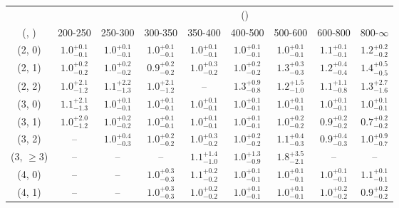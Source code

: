 \begin{table}[h!]
\tiny
\centering
{}
\begin{tabular}
{ccccccccc}
	\hline\hline
&	& \multicolumn{8}{c}{\scalht (\gev)} \\ 
	 (\njet,  \nb) & 200-250 & 250-300 & 300-350 & 350-400 & 400-500 & 500-600 & 600-800 & 800-$\infty$ \\ [0.8ex] 
\hline
	(2, 0) & $1.0^{+ 0.1 }_{- 0.1 }$ & $1.0^{+ 0.1 }_{- 0.1 }$ & $1.0^{+ 0.1 }_{- 0.1 }$ & $1.0^{+ 0.1 }_{- 0.1 }$ & $1.0^{+ 0.1 }_{- 0.1 }$ & $1.0^{+ 0.1 }_{- 0.1 }$ & $1.1^{+ 0.1 }_{- 0.1 }$ & $1.2^{+ 0.2 }_{- 0.2 }$ \\[0.5ex] 
	(2, 1) & $1.0^{+ 0.2 }_{- 0.2 }$ & $1.0^{+ 0.2 }_{- 0.2 }$ & $0.9^{+ 0.2 }_{- 0.2 }$ & $1.0^{+ 0.3 }_{- 0.2 }$ & $1.0^{+ 0.2 }_{- 0.2 }$ & $1.3^{+ 0.3 }_{- 0.3 }$ & $1.2^{+ 0.4 }_{- 0.4 }$ & $1.4^{+ 0.5 }_{- 0.5 }$ \\[0.5ex] 
	(2, 2) & $1.0^{+ 2.1 }_{- 1.2 }$ & $1.1^{+ 2.2 }_{- 1.3 }$ & $1.0^{+ 2.1 }_{- 1.2 }$ & -- & $1.3^{+ 0.9 }_{- 0.8 }$ & $1.2^{+ 1.5 }_{- 1.0 }$ & $1.1^{+ 1.1 }_{- 0.8 }$ & $1.3^{+ 2.7 }_{- 1.6 }$ \\[0.5ex] 
	(3, 0) & $1.1^{+ 2.1 }_{- 1.3 }$ & $1.0^{+ 0.1 }_{- 0.1 }$ & $1.0^{+ 0.1 }_{- 0.1 }$ & $1.0^{+ 0.1 }_{- 0.1 }$ & $1.0^{+ 0.1 }_{- 0.1 }$ & $1.0^{+ 0.1 }_{- 0.1 }$ & $1.0^{+ 0.1 }_{- 0.1 }$ & $1.0^{+ 0.1 }_{- 0.1 }$ \\[0.5ex] 
	(3, 1) & $1.0^{+ 2.0 }_{- 1.2 }$ & $1.0^{+ 0.2 }_{- 0.2 }$ & $1.0^{+ 0.1 }_{- 0.1 }$ & $1.0^{+ 0.1 }_{- 0.1 }$ & $1.0^{+ 0.1 }_{- 0.1 }$ & $1.0^{+ 0.2 }_{- 0.2 }$ & $0.9^{+ 0.2 }_{- 0.2 }$ & $0.7^{+ 0.2 }_{- 0.2 }$ \\[0.5ex] 
	(3, 2) & -- & $1.0^{+ 0.4 }_{- 0.3 }$ & $1.0^{+ 0.2 }_{- 0.2 }$ & $1.0^{+ 0.3 }_{- 0.2 }$ & $1.0^{+ 0.2 }_{- 0.2 }$ & $1.1^{+ 0.4 }_{- 0.3 }$ & $0.9^{+ 0.4 }_{- 0.3 }$ & $1.0^{+ 0.9 }_{- 0.7 }$ \\[0.5ex] 
	(3, $\ge3$) & -- & -- & -- & $1.1^{+ 1.4 }_{- 1.0 }$ & $1.0^{+ 1.3 }_{- 0.9 }$ & $1.8^{+ 3.5 }_{- 2.1 }$ & -- & -- \\[0.5ex] 
	(4, 0) & -- & -- & $1.0^{+ 0.3 }_{- 0.3 }$ & $1.1^{+ 0.2 }_{- 0.2 }$ & $1.0^{+ 0.1 }_{- 0.1 }$ & $1.0^{+ 0.1 }_{- 0.1 }$ & $1.0^{+ 0.1 }_{- 0.1 }$ & $1.1^{+ 0.1 }_{- 0.1 }$ \\[0.5ex] 
	(4, 1) & -- & -- & $1.0^{+ 0.3 }_{- 0.3 }$ & $1.0^{+ 0.2 }_{- 0.2 }$ & $1.0^{+ 0.1 }_{- 0.1 }$ & $1.0^{+ 0.1 }_{- 0.1 }$ & $1.0^{+ 0.2 }_{- 0.2 }$ & $0.9^{+ 0.2 }_{- 0.2 }$ \\[0.5ex] 

\end{tabular}
\end{table}
